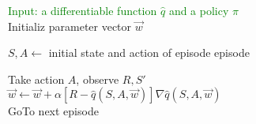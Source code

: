 \documentclass{standalone}
\begin{document}
\pagestyle{empty}
\begin{algorithm}[H]
  \textcolor{Green}{Input: a differentiable function $\hat{q}$ and a policy $\pi$}\\
  \textcolor{Cerulean}{Initializ parameter vector $\vec{w}$} \\
 {
	$S,A \leftarrow$ initial state and action of episode
	episode\\
   {
  	Take action $A$, observe $R, S'$\\
  	 {
  		$\vec{w} \leftarrow \vec{w} + \alpha [R-\hat{q}(S,A,\vec{w})]\nabla\hat{q}(S,A,\vec{w})$\\
  		GoTo next episode\\
  	} 
  	
  }
  
}
\end{algorithm}
\end{document}
